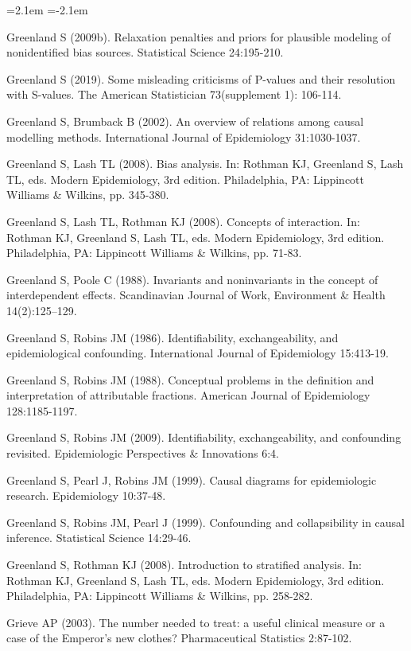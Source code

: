 \begin{list}{}{\leftmargin=2.1em   \itemindent=-2.1em \parsep=0pt \itemsep=1.6pt \topsep=4pt \rightmargin=0pt}
\item Greenland S (2009b). Relaxation penalties and priors for plausible modeling of nonidentified bias sources. Statistical Science 24:195-210.
\item Greenland S (2019). Some misleading criticisms of P-values and their resolution with S-values. The American Statistician 73(supplement 1): 106-114.
\item Greenland S, Brumback B (2002). An overview of relations among causal modelling methods. International Journal of Epidemiology 31:1030-1037.
\item Greenland S, Lash TL (2008). Bias analysis. In: Rothman KJ, Greenland S, Lash TL, eds. Modern Epidemiology, 3rd edition. Philadelphia, PA: Lippincott Williams \& Wilkins, pp. 345-380.
\item Greenland S, Lash TL, Rothman KJ (2008). Concepts of interaction. In: Rothman KJ, Greenland S, Lash TL, eds. Modern Epidemiology, 3rd edition. Philadelphia, PA: Lippincott Williams \& Wilkins, pp. 71-83.
\item Greenland S, Poole C (1988). Invariants and noninvariants in the concept of interdependent effects. Scandinavian Journal of Work, Environment \& Health 14(2):125–129.
\item Greenland S, Robins JM (1986). Identifiability, exchangeability, and epidemiological confounding. International Journal of Epidemiology 15:413-19.
\item Greenland S, Robins JM (1988). Conceptual problems in the definition and interpretation of attributable fractions. American Journal of Epidemiology 128:1185-1197.
\item Greenland S, Robins JM (2009). Identifiability, exchangeability, and confounding revisited. Epidemiologic Perspectives \& Innovations 6:4.
\item Greenland S, Pearl J, Robins JM (1999). Causal diagrams for epidemiologic research. Epidemiology 10:37-48.
\item Greenland S, Robins JM, Pearl J (1999). Confounding and collapsibility in causal inference. Statistical Science 14:29-46.
\item Greenland S, Rothman KJ (2008). Introduction to stratified analysis. In: Rothman KJ, Greenland S, Lash TL, eds. Modern Epidemiology, 3rd edition. Philadelphia, PA: Lippincott Williams \& Wilkins, pp. 258-282.
\item Grieve AP (2003). The number needed to treat: a useful clinical measure or a case of the Emperor's new clothes? Pharmaceutical Statistics 2:87-102.

\end{list}
